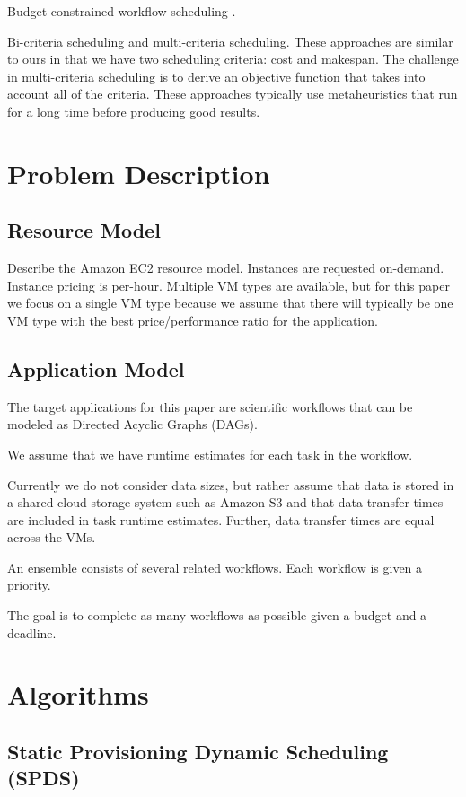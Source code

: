 \documentclass{sig-alternate}
\begin{document}
Budget-constrained workflow scheduling \cite{Sakellariou2007}.

Bi-criteria scheduling and multi-criteria scheduling. These approaches are similar to ours in that we have two scheduling criteria: cost and makespan. The challenge in multi-criteria scheduling is to derive an objective function that takes into account all of the criteria. These approaches typically use metaheuristics that run for a long time before producing good results.

\section{Problem Description}
\subsection{Resource Model}
Describe the Amazon EC2 resource model. Instances are requested on-demand. Instance pricing is per-hour. Multiple VM types are available, but for this paper we focus on a single VM type because we assume that there will typically be one VM type with the best price/performance ratio for the application.

\subsection{Application Model}
The target applications for this paper are scientific workflows that can be modeled as Directed Acyclic Graphs (DAGs).

We assume that we have runtime estimates for each task in the workflow.

Currently we do not consider data sizes, but rather assume that data is stored in a shared cloud storage system such as Amazon S3 and that data transfer times are included in task runtime estimates. Further, data transfer times are equal across the VMs.

An ensemble consists of several related workflows. Each workflow is given a priority.

The goal is to complete as many workflows as possible given a budget and a deadline.

\section{Algorithms}

\subsection{Static Provisioning Dynamic Scheduling (SPDS)}
\end{document}
